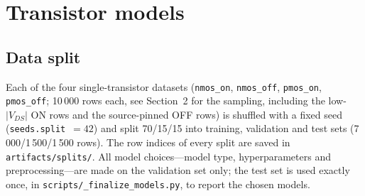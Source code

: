 %
%

\section{Transistor models}\label{sec:models}

\subsection{Data split}
Each of the four single-transistor datasets (\texttt{nmos\_on}, \texttt{nmos\_off}, \texttt{pmos\_on},
\texttt{pmos\_off}; 10\,000 rows each, see Section~2 for the sampling,
including the low-$|V_{DS}|$ ON rows and the source-pinned OFF rows) is shuffled with a fixed
seed (\texttt{seeds.split}~$=42$) and split 70/15/15 into training, validation and test sets
(7\,000/1\,500/1\,500 rows). The row indices of every split are saved in
\texttt{artifacts/\allowbreak splits/}. All model choices---model type, hyperparameters and
preprocessing---are made on the validation set only; the test set is used exactly once, in
\texttt{scripts/\_finalize\_\allowbreak models.py}, to report the chosen models.

